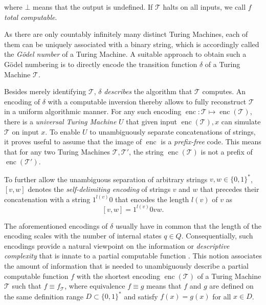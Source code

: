 where $\bot$ means that the output is undefined.
If $\mathcal{T}$ halts on all inputs, we call $f$ \textit{total computable}.

As there are only countably infinitely many distinct Turing Machines, each of them can be uniquely associated with a binary string, which is accordingly called the \textit{G\"odel number} of a Turing Machine.
A suitable approach to obtain such a G\"odel numbering is to directly encode the transition function $\delta$ of a Turing Machine $\mathcal{T}$.

Besides merely identifying $\mathcal{T}$, $\delta$ \textit{describes} the algorithm that $\mathcal{T}$ computes. 
An encoding of $\delta$ with a computable inversion thereby allows to fully reconstruct $\mathcal{T}$ in a uniform algorithmic manner.
\label{text:universal-tm}
For any such encoding $\operatorname{enc}:\mathcal{T}\mapsto \operatorname{enc}(\mathcal{T})$, there is a \textit{universal Turing Machine} $U$ that given input $\operatorname{enc}(\mathcal{T}),x$ can simulate $\mathcal{T}$ on input $x$.
To enable $U$ to unambiguously separate concatenations of strings, it proves useful to assume that the image of $\operatorname{enc}$ is a \textit{prefix-free} code.
This means that for any two Turing Machines $\mathcal{T},\mathcal{T}'$, the string $\operatorname{enc}(\mathcal{T})$ is not a prefix of $\operatorname{enc}(\mathcal{T}'
)$.

To further allow the unambiguous separation of arbitrary strings $v,w\in\{0,1\}^{*}$, $[v,w]$ denotes the \textit{self-delimiting encoding} of strings $v$ and $w$ that precedes their concatenation with a string $1^{l(v)}0$ that encodes the length $l(v)$ of $v$ as
\begin{equation}
	\label{eq:self-delimiting-encoding}
	[v,w]=1^{l(v)}0vw.
\end{equation}

The aforementioned encodings of $\delta$ usually have in common that the length of the encoding scales with the number of internal states $q\in Q$.
Consequentially, such encodings provide a natural viewpoint on the information or \textit{descriptive complexity} that is innate to a partial computable function \cite{li2008kolmogorov}.
This notion associates the amount of information that is needed to unambiguously describe a partial computable function $f$ with the shortest encoding $\operatorname{enc}(\mathcal{T})$ of a Turing Machine $\mathcal{T}$ such that $f\equiv f_{\mathcal{T}}$, where equivalence $f \equiv g$ means that $f$ and $g$ are defined on the same definition range $D\subset\{0,1\}^{*}$ and satisfy $f(x)=g(x)$ for all $x\in D$.

